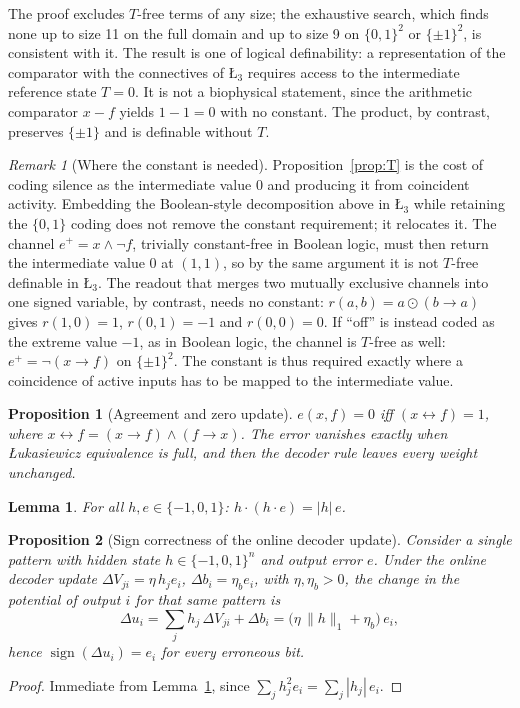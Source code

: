\documentclass[11pt,a4paper]{article}
\newtheorem{proposition}{Proposition}
\newtheorem{lemma}{Lemma}
\theoremstyle{remark}
\newtheorem{remark}{Remark}
\newcommand{\Lt}{\text{\L}_3}
\newcommand{\sgn}{\operatorname{sign}}
\begin{document}
The proof excludes $T$-free terms of any size; the exhaustive search, which finds none up to size 11 on the full domain and up to size 9 on $\{0,1\}^2$ or $\{\pm1\}^2$, is consistent with it. The result is one of logical definability: a representation of the comparator with the connectives of $\Lt$ requires access to the intermediate reference state $T=0$. It is not a biophysical statement, since the arithmetic comparator $x-f$ yields $1-1=0$ with no constant. The product, by contrast, preserves $\{\pm1\}$ and is definable without $T$.

\begin{remark}[Where the constant is needed]\label{rem:where}
Proposition~\ref{prop:T} is the cost of coding silence as the intermediate value $0$ and producing it from coincident activity. Embedding the Boolean-style decomposition above in $\Lt$ while retaining the $\{0,1\}$ coding does not remove the constant requirement; it relocates it. The channel $e^+=x\land\neg f$, trivially constant-free in Boolean logic, must then return the intermediate value $0$ at $(1,1)$, so by the same argument it is not $T$-free definable in $\Lt$. The readout that merges two mutually exclusive channels into one signed variable, by contrast, needs no constant: $r(a,b)=a\odot(b\to a)$ gives $r(1,0)=1$, $r(0,1)=-1$ and $r(0,0)=0$. If ``off'' is instead coded as the extreme value $-1$, as in Boolean logic, the channel is $T$-free as well: $e^+=\neg(x\to f)$ on $\{\pm1\}^2$. The constant is thus required exactly where a coincidence of active inputs has to be mapped to the intermediate value.
\end{remark}

\begin{proposition}[Agreement and zero update]\label{prop:homeo}
$e(x,f)=0$ iff $(x\leftrightarrow f)=1$, where $x\leftrightarrow f=(x\to f)\wedge(f\to x)$. The error vanishes exactly when \L ukasiewicz equivalence is full, and then the decoder rule leaves every weight unchanged.
\end{proposition}

\begin{lemma}\label{lem:square}
For all $h,e\in\{-1,0,1\}$: $h\cdot(h\cdot e)=|h|\,e$.
\end{lemma}

\begin{proposition}[Sign correctness of the online decoder update]\label{prop:sign}
Consider a single pattern with hidden state $h\in\{-1,0,1\}^n$ and output error $e$. Under the online decoder update $\Delta V_{ji}=\eta\,h_j e_i$, $\Delta b_i=\eta_b e_i$, with $\eta,\eta_b>0$, the change in the potential of output $i$ for that same pattern is
\[
\Delta u_i=\sum_j h_j\,\Delta V_{ji}+\Delta b_i=\bigl(\eta\,\lVert h\rVert_1+\eta_b\bigr)\,e_i ,
\]
hence $\sgn(\Delta u_i)=e_i$ for every erroneous bit.
\end{proposition}
\begin{proof}
Immediate from Lemma~\ref{lem:square}, since $\sum_j h_j^2 e_i=\sum_j|h_j|\,e_i$.
\end{proof}
\end{document}
